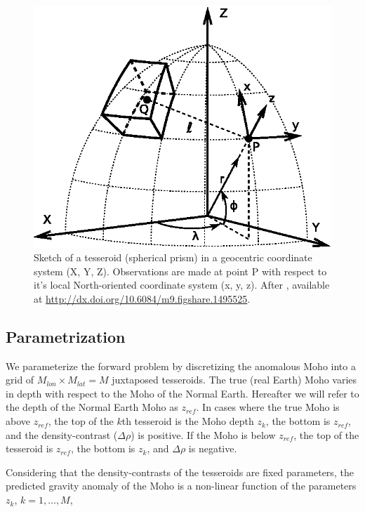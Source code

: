 \documentclass[extra,mreferee]{gji}
\begin{document}
\begin{figure}
    \centering
    \includegraphics[width=\columnwidth]{figures/paper/tesseroid-coord-sys}
    \caption{Sketch of a tesseroid (spherical prism) in a geocentric coordinate
        system (X, Y, Z).
        Observations are made at point P with respect to it's local
        North-oriented coordinate system (x, y, z).
        After \citet{uieda2015},
        available at
        \url{http://dx.doi.org/10.6084/m9.figshare.1495525}.
    }
    \label{fig:tesseroid}
\end{figure}



\subsection{Parametrization}

We parameterize the forward problem by discretizing the anomalous Moho
into a grid of $M_{lon} \times M_{lat} = M$ juxtaposed tesseroids.
The true (real Earth) Moho varies in depth
with respect to the Moho of the Normal Earth.
Hereafter we will refer to the depth of the Normal Earth Moho as $z_{ref}$.
In cases where the true Moho is above $z_{ref}$,
the top of the $k$th tesseroid is the Moho depth $z_{k}$,
the bottom is $z_{ref}$, and the density-contrast ($\Delta\rho$) is positive.
If the Moho is below $z_{ref}$, the top of the tesseroid is $z_{ref}$,
the bottom is $z_k$, and $\Delta\rho$ is negative.

Considering that the density-contrasts of the tesseroids are fixed parameters,
the predicted gravity anomaly of the Moho is a non-linear function of the
parameters $z_k$, $k=1, \ldots, M$,
\end{document}
